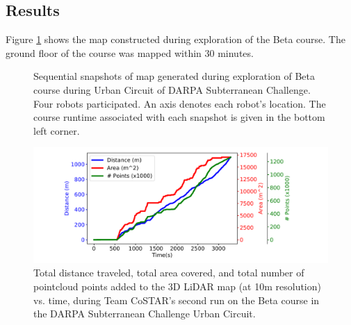 \documentclass{article}
\begin{document}
\subsection{Results}

Figure \ref{fig:beta_map} shows the map constructed during exploration of the Beta course. The ground floor of the course was mapped within 30 minutes.  

\begin{figure}[h!]
\centering
\caption{Sequential snapshots of map generated during exploration of Beta course during Urban Circuit of DARPA Subterranean Challenge. Four robots participated. An axis denotes each robot's location. The course runtime associated with each snapshot is given in the bottom left corner.} \label{fig:beta_map} 
\end{figure}


\begin{figure}[ht!]
  \includegraphics[width=.48\textwidth,trim=3cm 0 4cm 0, clip]{figures/dist_traveled.pdf}
  \centering
  \caption{Total distance traveled, total area covered, and total number of pointcloud points added to the 3D LiDAR map (at 10m resolution) vs.  time, during Team CoSTAR's second run on the Beta course in the DARPA Subterranean Challenge Urban Circuit.}
  \label{fig:dist_traveled}
\end{figure}
\end{document}
